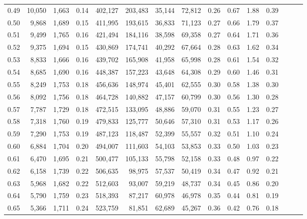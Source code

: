 \begin{tabular}{rrrrrrrrrrrrrrr}
0.49 &  10,050 &  1,663 &  0.14 &  402,127 &  203,483 &   35,144 &   72,812 &  0.26 &  0.67 &  1.88 &      0.39 \\
0.50 &   9,868 &  1,689 &  0.15 &  411,995 &  193,615 &   36,833 &   71,123 &  0.27 &  0.66 &  1.79 &      0.37 \\
0.51 &   9,499 &  1,765 &  0.16 &  421,494 &  184,116 &   38,598 &   69,358 &  0.27 &  0.64 &  1.71 &      0.36 \\
0.52 &   9,375 &  1,694 &  0.15 &  430,869 &  174,741 &   40,292 &   67,664 &  0.28 &  0.63 &  1.62 &      0.34 \\
0.53 &   8,833 &  1,666 &  0.16 &  439,702 &  165,908 &   41,958 &   65,998 &  0.28 &  0.61 &  1.54 &      0.32 \\
0.54 &   8,685 &  1,690 &  0.16 &  448,387 &  157,223 &   43,648 &   64,308 &  0.29 &  0.60 &  1.46 &      0.31 \\
0.55 &   8,249 &  1,753 &  0.18 &  456,636 &  148,974 &   45,401 &   62,555 &  0.30 &  0.58 &  1.38 &      0.30 \\
0.56 &   8,092 &  1,756 &  0.18 &  464,728 &  140,882 &   47,157 &   60,799 &  0.30 &  0.56 &  1.30 &      0.28 \\
0.57 &   7,787 &  1,729 &  0.18 &  472,515 &  133,095 &   48,886 &   59,070 &  0.31 &  0.55 &  1.23 &      0.27 \\
0.58 &   7,318 &  1,760 &  0.19 &  479,833 &  125,777 &   50,646 &   57,310 &  0.31 &  0.53 &  1.17 &      0.26 \\
0.59 &   7,290 &  1,753 &  0.19 &  487,123 &  118,487 &   52,399 &   55,557 &  0.32 &  0.51 &  1.10 &      0.24 \\
0.60 &   6,884 &  1,704 &  0.20 &  494,007 &  111,603 &   54,103 &   53,853 &  0.33 &  0.50 &  1.03 &      0.23 \\
0.61 &   6,470 &  1,695 &  0.21 &  500,477 &  105,133 &   55,798 &   52,158 &  0.33 &  0.48 &  0.97 &      0.22 \\
0.62 &   6,158 &  1,739 &  0.22 &  506,635 &   98,975 &   57,537 &   50,419 &  0.34 &  0.47 &  0.92 &      0.21 \\
0.63 &   5,968 &  1,682 &  0.22 &  512,603 &   93,007 &   59,219 &   48,737 &  0.34 &  0.45 &  0.86 &      0.20 \\
0.64 &   5,790 &  1,759 &  0.23 &  518,393 &   87,217 &   60,978 &   46,978 &  0.35 &  0.44 &  0.81 &      0.19 \\
0.65 &   5,366 &  1,711 &  0.24 &  523,759 &   81,851 &   62,689 &   45,267 &  0.36 &  0.42 &  0.76 &      0.18 \\

\end{tabular}
